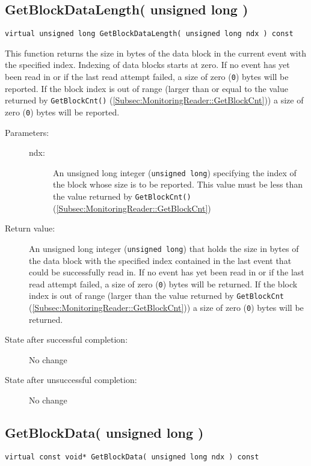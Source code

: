 \documentclass[a4paper,twoside]{article}
\begin{document}
\subsection{GetBlockDataLength( unsigned long )}
\label{Subsec:MonitoringReader::GetBlockDataLength}
\texttt{virtual unsigned long GetBlockDataLength( unsigned long ndx ) const}

This function returns the size in bytes of the data block in the current event with the specified index. Indexing of data blocks starts at zero.
If no event has yet been read in or if the last read attempt failed, a size of zero (\texttt{0}) bytes will be reported.
If the block index is out of range (larger than or equal to the value returned by \texttt{GetBlockCnt()} (\ref{Subsec:MonitoringReader::GetBlockCnt})) a size of 
zero (\texttt{0}) bytes will be reported.

\begin{description}
\item[Parameters:]
	\begin{description}
		\item[ndx:] An unsigned long integer (\texttt{unsigned long}) specifying the index of the block whose size is 
		to be reported. This value must be less than the value returned by \texttt{GetBlockCnt()} (\ref{Subsec:MonitoringReader::GetBlockCnt})
	\end{description}
\item[Return value:] An  unsigned long integer (\texttt{unsigned long}) that holds the size in bytes of the data block with the specified index 
contained in the last event that could be successfully read in. 
If no event has yet been read in or if the last read attempt failed, a size of zero (\texttt{0}) bytes will be returned.
If the block index is out of range (larger than the value returned by \texttt{GetBlockCnt} (\ref{Subsec:MonitoringReader::GetBlockCnt})) a size of 
zero (\texttt{0}) bytes will be returned.
\item[State after successful completion:] No change
\item[State after unsuccessful completion:] No change
\end{description}


\subsection{GetBlockData( unsigned long )}
\label{Subsec:MonitoringReader::GetBlockData}
\texttt{virtual const void* GetBlockData( unsigned long ndx ) const}
\end{document}
